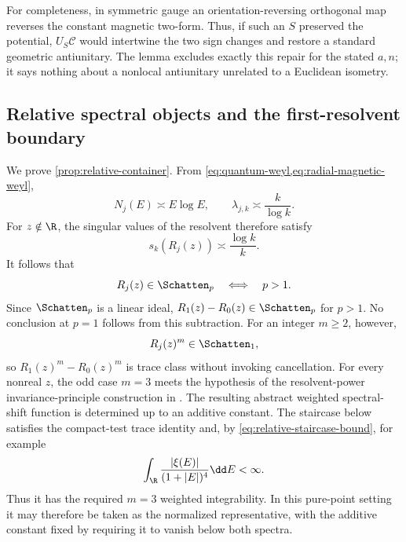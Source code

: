 For completeness, in symmetric gauge an orientation-reversing orthogonal
map reverses the constant magnetic two-form.  Thus, if such an \(S\)
preserved the potential, \(U_S\mathcal C\) would intertwine the two sign
changes and restore a standard geometric antiunitary.  The lemma excludes
exactly this repair for the stated \(a,n\); it says nothing about a nonlocal
antiunitary unrelated to a Euclidean isometry.

\subsection{Relative spectral objects and the first-resolvent boundary}
\label{app:relative-container}

We prove \cref{prop:relative-container}.  From
\cref{eq:quantum-weyl,eq:radial-magnetic-weyl},
\begin{equation}
 N_j(E)\asymp E\log E,
 \qquad
 \lambda_{j,k}\asymp\frac{k}{\log k}.
 \label{eq:app-eigenvalue-growth}
\end{equation}
For \(z\notin\R\), the singular values of the resolvent therefore satisfy
\begin{equation}
 s_k(R_j(z))\asymp\frac{\log k}{k}.
 \label{eq:app-resolvent-singular-values}
\end{equation}
It follows that
\begin{equation}
 R_j(z)\in\Schatten_p\quad\Longleftrightarrow\quad p>1.
 \label{eq:app-resolvent-threshold}
\end{equation}
Since \(\Schatten_p\) is a linear ideal,
\(R_1(z)-R_0(z)\in\Schatten_p\) for \(p>1\).  No conclusion at \(p=1\)
follows from this subtraction.  For an integer \(m\geq2\), however,
\begin{equation}
 R_j(z)^m\in\Schatten_1,
\end{equation}
so \(R_1(z)^m-R_0(z)^m\) is trace class without invoking cancellation.
For every nonreal \(z\), the odd case \(m=3\) meets the hypothesis of the
resolvent-power invariance-principle construction in \citet{Yafaev2005}.
The resulting abstract weighted spectral-shift function is determined up to
an additive constant.  The staircase below satisfies the compact-test trace
identity and, by \cref{eq:relative-staircase-bound}, for example
\[
 \int_\R \frac{|\xi(E)|}{(1+|E|)^4}\dd E<\infty.
\]
Thus it has the required \(m=3\) weighted integrability.  In this pure-point
setting it may therefore be taken as the normalized representative, with the
additive constant fixed by requiring it to vanish below both spectra.

